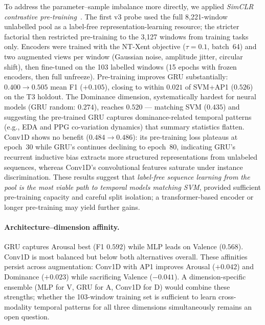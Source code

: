 \documentclass[sigconf,nonacm]{acmart}
\begin{document}
To address the parameter--sample imbalance more directly, we applied
\emph{SimCLR contrastive pre-training}~\cite{chen2020simclr}.
The first v3 probe used the full 8{,}221-window unlabelled pool as a
label-free representation-learning resource; the stricter factorial then
restricted pre-training to the 3{,}127 windows from training tasks only.
Encoders were trained with the NT-Xent objective ($\tau{=}0.1$, batch~64) and
two augmented views per window (Gaussian noise, amplitude jitter, circular
shift), then fine-tuned on the 103 labelled windows (15 epochs with frozen
encoders, then full unfreeze).
Pre-training improves GRU substantially: $0.400 \to 0.505$ mean F1 ($+0.105$),
closing to within $0.021$ of SVM+AP1 ($0.526$) on the T3 holdout.
The Dominance dimension, systematically hardest for neural models
(GRU random: $0.274$), reaches $0.520$ --- matching SVM ($0.435$) and
suggesting the pre-trained GRU captures dominance-related temporal patterns
(e.g., EDA and PPG co-variation dynamics) that summary statistics flatten.
Conv1D shows no benefit ($0.484 \to 0.486$): its pre-training loss plateaus
at epoch~30 while GRU's continues declining to epoch~80, indicating GRU's
recurrent inductive bias extracts more structured representations from unlabeled
sequences, whereas Conv1D's convolutional features saturate under instance
discrimination.
These results suggest that \emph{label-free sequence learning from the pool
is the most viable path to temporal models matching SVM}, provided sufficient
pre-training capacity and careful split isolation; a transformer-based encoder
or longer pre-training may yield further gains.

\paragraph{Architecture--dimension affinity.}
GRU captures Arousal best (F1 $0.592$) while MLP leads on Valence ($0.568$).
Conv1D is most balanced but below both alternatives overall.
These affinities persist across augmentation: Conv1D with AP1 improves Arousal
($+0.042$) and Dominance ($+0.023$) while sacrificing Valence ($-0.041$).
A dimension-specific ensemble (MLP for V, GRU for A, Conv1D for D) would
combine these strengths; whether the 103-window training set is sufficient
to learn cross-modality temporal patterns for all three dimensions simultaneously
remains an open question.
\end{document}
